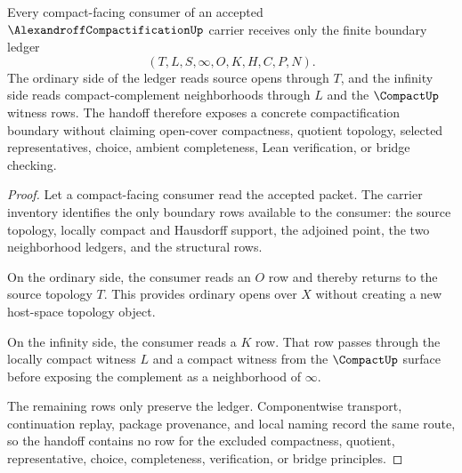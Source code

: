 \begin{theorem}
\label{thm:alexandroff-compactification-compact-boundary-ledger}
Every compact-facing consumer of an accepted $\AlexandroffCompactificationUp$ carrier receives only the finite boundary ledger
$$
(T,L,S,\infty,O,K,H,C,P,N).
$$
The ordinary side of the ledger reads source opens through $T$, and the infinity side reads compact-complement neighborhoods through $L$ and the $\CompactUp$ witness rows. The handoff therefore exposes a concrete compactification boundary without claiming open-cover compactness, quotient topology, selected representatives, choice, ambient completeness, Lean verification, or bridge checking.
\end{theorem}
\begin{proof}
Let a compact-facing consumer read the accepted packet. The carrier inventory identifies the only boundary rows available to the consumer: the source topology, locally compact and Hausdorff support, the adjoined point, the two neighborhood ledgers, and the structural rows.

On the ordinary side, the consumer reads an $O$ row and thereby returns to the source topology $T$. This provides ordinary opens over $X$ without creating a new host-space topology object.

On the infinity side, the consumer reads a $K$ row. That row passes through the locally compact witness $L$ and a compact witness from the $\CompactUp$ surface before exposing the complement as a neighborhood of $\infty$.

The remaining rows only preserve the ledger. Componentwise transport, continuation replay, package provenance, and local naming record the same route, so the handoff contains no row for the excluded compactness, quotient, representative, choice, completeness, verification, or bridge principles.
\end{proof}


